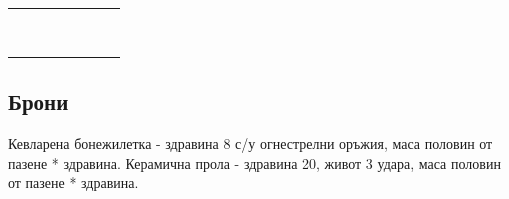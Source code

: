\begin{tabular}{p{2cm} | p{2cm} | p{2cm} | p{2cm} | p{2cm} | p{2cm} | p{2cm}}
                      &                      &            &            &                &                          \\
                      &                      &            &            &                &                          \\
                      &                      &            &            &                &                          \\
                      &                      &            &            &                &                          \\
                      &                      &            &            &                &                          \\
                      &                      &            &            &                &                          \\
                      &                      &            &            &                &                          \\
                      &                      &            &            &                &                          \\

\end{tabular}

\subsection{Брони}
Кевларена бонежилетка - здравина 8 с/у огнестрелни оръжия, маса половин от пазене * здравина.
Керамична прола - здравина 20, живот 3 удара, маса половин от пазене * здравина.

